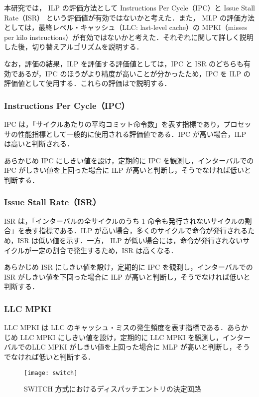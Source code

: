 本研究では， ILP の評価方法として Instructions Per Cycle（IPC）と Issue Stall Rate（ISR） という評価値が有効ではないかと考えた．また， MLP の評価方法としては，最終レベル・キャッシュ（LLC: last-level cache）の MPKI（misses per kilo instructions）が有効ではないかと考えた．それぞれに関して詳しく説明した後，切り替えアルゴリズムを説明する．

なお，評価の結果，ILP を評価する評価値としては，IPC と ISR のどちらも有効であるが，IPC のほうがより精度が高いことが分かったため，IPC を ILP の評価値として使用する．これらの評価はで説明する．

\subsubsection{Instructions Per Cycle（IPC）}
IPC は，「サイクルあたりの平均コミット命令数」を表す指標であり，プロセッサの性能指標として一般的に使用される評価値である．IPC が高い場合，ILP は高いと判断される．

あらかじめ IPC にしきい値を設け，定期的に IPC を観測し，インターバルでの IPC がしきい値を上回った場合に ILP が高いと判断し，そうでなければ低いと判断する．

\subsubsection{Issue Stall Rate（ISR）}
ISR は，「インターバルの全サイクルのうち 1 命令も発行されないサイクルの割合」を表す指標である．ILP が高い場合，多くのサイクルで命令が発行されるため，ISR は低い値を示す．一方， ILP が低い場合には，命令が発行されないサイクルが一定の割合で発生するため，ISR は高くなる．

あらかじめ ISR にしきい値を設け，定期的に IPC を観測し，インターバルでの ISR がしきい値を下回った場合に ILP が高いと判断し，そうでなければ低いと判断する．

\subsubsection{LLC MPKI}
LLC MPKI は LLC のキャッシュ・ミスの発生頻度を表す指標である．あらかじめ LLC MPKI にしきい値を設け，定期的に LLC MPKI を観測し，インターバルでのLLC MPKI がしきい値を上回った場合に MLP が高いと判断し，そうでなければ低いと判断する．

\begin{figure}[htb]
  \centering
  \texttt{[image: switch]}
  \caption{SWITCH 方式におけるディスパッチエントリの決定回路}
  \label{fig:switch}
\end{figure}

